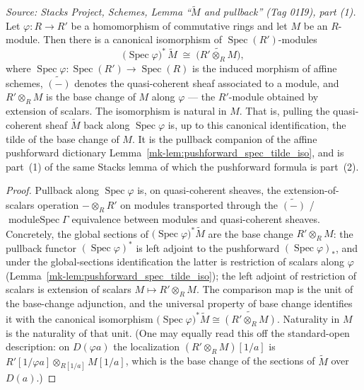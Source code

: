\begin{lemma}\label{mk-lem:pullback_spec_tilde_iso}
  \leanok

  \textit{Source: Stacks Project, Schemes, Lemma ``\(\widetilde M\) and pullback''
  (Tag 01I9), part (1).}
  Let \(\varphi : R \to R'\) be a homomorphism of commutative rings and let \(M\)
  be an \(R\)-module. Then there is a canonical isomorphism of
  \(\operatorname{Spec}(R')\)-modules
  \[
    \bigl(\operatorname{Spec}\varphi\bigr)^{*}\,\widetilde{M}
    \;\cong\;
    \widetilde{\bigl(R' \otimes_R M\bigr)},
  \]
  where \(\operatorname{Spec}\varphi : \operatorname{Spec}(R') \to
  \operatorname{Spec}(R)\) is the induced morphism of affine schemes,
  \(\widetilde{(-)}\) denotes the quasi-coherent sheaf associated to a module, and
  \(R' \otimes_R M\) is the base change of \(M\) along \(\varphi\) — the
  \(R'\)-module obtained by extension of scalars. The isomorphism is natural in
  \(M\). That is, pulling the quasi-coherent sheaf \(\widetilde{M}\) back along
  \(\operatorname{Spec}\varphi\) is, up to this canonical identification, the tilde
  of the base change of \(M\). It is the pullback companion of the affine
  pushforward dictionary Lemma~\ref{mk-lem:pushforward_spec_tilde_iso}, and is part~(1)
  of the same Stacks lemma of which the pushforward formula is part~(2).
\end{lemma}
\begin{proof}
  \leanok
  Pullback along \(\operatorname{Spec}\varphi\) is, on quasi-coherent sheaves, the
  extension-of-scalars operation \(- \otimes_R R'\) on modules transported through
  the \(\widetilde{(-)}\) / \(\operatorname{moduleSpec}\Gamma\) equivalence between
  modules and quasi-coherent sheaves. Concretely, the global sections of
  \(\bigl(\operatorname{Spec}\varphi\bigr)^{*}\widetilde{M}\) are the base change
  \(R' \otimes_R M\): the pullback functor \((\operatorname{Spec}\varphi)^{*}\) is
  left adjoint to the pushforward \((\operatorname{Spec}\varphi)_{*}\), and under
  the global-sections identification the latter is restriction of scalars along
  \(\varphi\) (Lemma~\ref{mk-lem:pushforward_spec_tilde_iso}); the left adjoint of
  restriction of scalars is extension of scalars \(M \mapsto R' \otimes_R M\). The
  comparison map is the unit of the base-change adjunction, and the universal
  property of base change identifies it with the canonical isomorphism
  \(\bigl(\operatorname{Spec}\varphi\bigr)^{*}\widetilde{M} \cong
  \widetilde{(R' \otimes_R M)}\). Naturality in \(M\) is the naturality of that
  unit. (One may equally read this off the standard-open description: on
  \(D(\varphi a)\) the localization \((R' \otimes_R M)[1/a]\) is
  \(R'[1/\varphi a] \otimes_{R[1/a]} M[1/a]\), which is the base change of the
  sections of \(\widetilde M\) over \(D(a)\).)
\end{proof}

